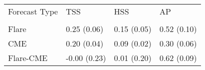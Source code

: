 \begin{tabular}{llll}
\toprule
Forecast Type & TSS & HSS & AP \\
 &  &  &  \\
\midrule
Flare & 0.25 (0.06) & 0.15 (0.05) & 0.52 (0.10) \\
CME & 0.20 (0.04) & 0.09 (0.02) & 0.30 (0.06) \\
Flare-CME & -0.00 (0.23) & 0.01 (0.20) & 0.62 (0.09) \\
\bottomrule
\end{tabular}
